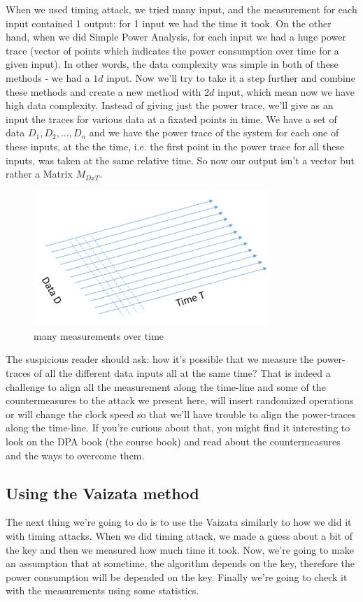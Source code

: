 When we used timing attack, we tried many input, and the measurement for each input contained 1 output: for 1 input we had the time it took.
On the other hand, when we did Simple Power Analysis, for each input we had a huge power trace (vector of points which indicates the power consumption over time for a given input).
In other words, the data complexity was simple in both of these methods - we had a $1d$ input.
Now we'll try to take it a step further and combine these methods and create a new method with $2d$ input, which mean now we have high data complexity.
Instead of giving just the power trace, we'll give as an input the traces for various data at a fixated points in time. We have a set of data ${D_1, D_2, ..., D_n}$ and we have the power trace of the system for each one of these inputs, at the the time, i.e. the first point in the power trace for all these inputs, was taken at the same relative time.
So now our output isn't a vector but rather a Matrix $M_{DxT}$.

\begin{figure}[!ht]
    \centering
    \includegraphics[width=0.8\textwidth]{images/Lecture6/DPA_Illustration.png}
    \caption{many measurements over time} \label{fig:DPA_Illustration}
\end{figure}

The suspicious reader should ask: how it's possible that we measure the power-traces of all the different data inputs all at the same time? That is indeed a challenge to align all the measurement along the time-line and some of the countermeasures to the attack we present here, will insert randomized operations or will change the clock speed so that we'll have trouble to align the power-traces along the time-line. If you're curious about that, you might find it interesting to look on the DPA book (the course book) and read about the countermeasures and the ways to overcome them.

\subsection{Using the Vaizata method}
The next thing we're going to do is to use the Vaizata similarly to how we did it with timing attacks. When we did timing attack, we made a guess about a bit of the key and then we measured how much time it took. Now, we're going to make an assumption that at sometime, the algorithm depends on the key, therefore the power consumption will be depended on the key. Finally we're going to check it with the measurements using some statistics. 

